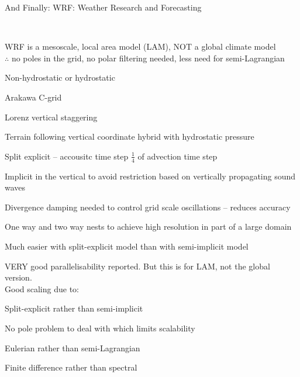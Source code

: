 \begin{slide}{And Finally: WRF: Weather Research and Forecasting}

\ \\
\begin{list0}

\item WRF is a mesoscale, local area model (LAM), NOT a global climate model\\
$\therefore$ no poles in the grid, no polar filtering needed, less need for semi-Lagrangian

\item Non-hydrostatic or hydrostatic

\item Arakawa C-grid

\item Lorenz vertical staggering

\item Terrain following vertical coordinate hybrid with hydrostatic pressure

\item Split explicit -- accousitc time step $\frac{1}{4}$ of advection time step

\item Implicit in the vertical to avoid restriction based on vertically propagating sound waves

\item Divergence damping needed to control grid scale oscillations -- reduces accuracy

\item One way and two way nests to achieve high resolution in part of a large domain
\begin{list1}
    \item Much easier with split-explicit model than with semi-implicit model
\end{list1}

\item VERY good parallelisability reported. But this is for LAM, not the global version.\\Good scaling due to:
\begin{list1}
    \item Split-explicit rather than semi-implicit
    \item No pole problem to deal with which limits scalability
    \item Eulerian rather than semi-Lagrangian
    \item Finite difference rather than spectral
\end{list1}

\end{list0}

\end{slide}

